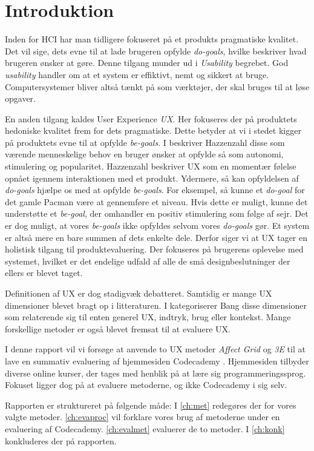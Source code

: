 \chapter{Introduktion}\label{ch:intro}
Inden for HCI har man tidligere fokuseret på et produkts pragmatiske kvalitet. Det vil sige, dets evne til at lade brugeren opfylde \textit{do-goals}, hvilke beskriver hvad brugeren ønsker at gøre. Denne tilgang munder ud i \textit{Usability} begrebet. God \textit{usability} handler om at et system er effiktivt, nemt og sikkert at bruge. Computersystemer bliver altså tænkt på som værktøjer, der skal bruges til at løse opgaver.

En anden tilgang kaldes User Experience \textit{UX}. Her fokuseres der på produktets hedoniske kvalitet frem for dets pragmatiske. Dette betyder at vi i stedet kigger på produktets evne til at opfylde \textit{be-goals}. I \cite{Hassenzahl:2008} beskriver Hazzenzahl disse som værende menneskelige behov en bruger ønsker at opfylde så som autonomi, stimulering og popularitet.
Hazzenzahl beskriver UX som en momentær følelse opnået igennem interaktionen med et produkt. Ydermere, så kan opfyldelsen af \textit{do-goals} hjælpe os med at opfylde \textit{be-goals}. For eksempel, så kunne et \textit{do-goal} for det gamle Pacman være at gennemføre et niveau. Hvis dette er muligt, kunne det understøtte et \textit{be-goal}, der omhandler en positiv stimulering som følge af sejr. Det er dog muligt, at vores \textit{be-goals} ikke opfyldes selvom vores \textit{do-goals} gør. Et system er altså mere en bare summen af  dets enkelte dele. Derfor siger vi at UX tager en holistisk tilgang til produktevaluering. Der fokuseres på brugerens oplevelse med systemet, hvilket er det endelige udfald af alle de små designbeslutninger der ellers er blevet taget.  

Definitionen af UX er dog stadigvæk debatteret. Samtidig er mange UX dimensioner blevet bragt op i litteraturen. I \cite{Bang2015} kategoriserer Bang disse dimensioner som relaterende sig til enten generel UX, indtryk, brug eller kontekst. Mange forskellige metoder er også blevet fremsat til at evaluere UX. 

I denne rapport vil vi forsøge at anvende to UX metoder \textit{Affect Grid} og \textit{3E} til at lave en summativ evaluering af hjemmesiden Codecademy \cite{Codecademy}. Hjemmesiden tilbyder diverse online kurser, der tages med henblik på at lære sig programmeringssprog. Fokuset ligger dog på at evaluere metoderne, og ikke Codecademy i sig selv.
 
Rapporten er struktureret på følgende måde: I \cref{ch:met} redegøres der for vores valgte metoder. \cref{ch:evaproc} vil forklare vores brug af metoderne under en evaluering af Codecademy. \cref{ch:evalmet} evaluerer de to metoder. I \cref{ch:konk} konkluderes der på rapporten.



   